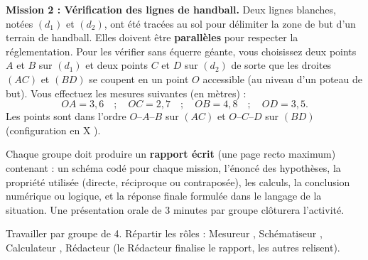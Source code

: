 \documentclass[11pt]{article}
\newcounter{popsec}
\newcounter{popsub}
\newcommand{\courssub}[1]{%
  \stepcounter{popsub}%
  \par\vspace{9pt}\noindent{\popxbold\fontsize{11.5}{13}\selectfont\color{popink}{\color{poporange}\thepopsec.\thepopsub}\hspace{6pt}#1}\par\nopagebreak\vspace{4pt}
}
\begin{document}
\vspace{0,3cm}
\noindent
\textbf{Mission 2 : Vérification des lignes de handball.}
Deux lignes blanches, notées $(d_1)$ et $(d_2)$, ont été tracées au sol pour délimiter la zone de but d'un terrain de handball. Elles doivent être \textbf{parallèles} pour respecter la réglementation. Pour les vérifier sans équerre géante, vous choisissez deux points $A$ et $B$ sur $(d_1)$ et deux points $C$ et $D$ sur $(d_2)$ de sorte que les droites $(AC)$ et $(BD)$ se coupent en un point $O$ accessible (au niveau d'un poteau de but). Vous effectuez les mesures suivantes (en mètres) :
\[
OA = 3,6 \quad ; \quad OC = 2,7 \quad ; \quad OB = 4,8 \quad ; \quad OD = 3,5.
\]
Les points sont dans l'ordre $O$--$A$--$B$ sur $(AC)$ et $O$--$C$--$D$ sur $(BD)$ (configuration en \og X \fg{}).

\vspace{0,3cm}
\noindent
Chaque groupe doit produire un \textbf{rapport écrit} (une page recto maximum) contenant : un schéma codé pour chaque mission, l'énoncé des hypothèses, la propriété utilisée (directe, réciproque ou contraposée), les calculs, la conclusion numérique ou logique, et la réponse finale formulée dans le langage de la situation. Une présentation orale de 3 minutes par groupe clôturera l'activité.

\courssub{Consignes}
\noindent
Travailler par groupe de 4. Répartir les rôles : \og Mesureur \fg{}, \og Schématiseur \fg{}, \og Calculateur \fg{}, \og Rédacteur \fg{} (le Rédacteur finalise le rapport, les autres relisent).
\end{document}
